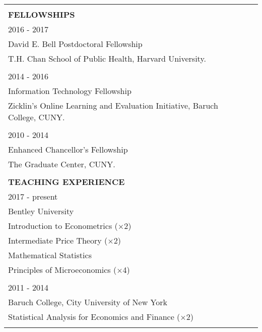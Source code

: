 \documentclass[12 pt]{article}
\begin{document}
\begin{longtable}{ccccc}
\\
\\


 \multicolumn{5}{l}{\textbf{FELLOWSHIPS}}\\[2 pt] 
 \multicolumn{4}{l}{2016 - 2017} \\
 \multicolumn{4}{l}{David E. Bell Postdoctoral Fellowship} \\
\multicolumn{4}{l}{T.H. Chan School of Public Health, Harvard University.}   \\
\\


 \multicolumn{4}{l}{2014 - 2016} \\
 \multicolumn{4}{l}{Information Technology Fellowship} \\
\multicolumn{4}{l}{Zicklin's Online Learning and Evaluation Initiative, Baruch College, CUNY.}   \\

\\

 \multicolumn{4}{l}{2010 - 2014} \\
 \multicolumn{4}{l}{Enhanced Chancellor's Fellowship}  \\
\multicolumn{4}{l}{The Graduate Center, CUNY.}   \\

\\


 \multicolumn{5}{l}{\textbf{TEACHING EXPERIENCE}}\\[2 pt] 
  \multicolumn{4}{l}{2017 - present} \\
\multicolumn{4}{l}{Bentley University}   \\
 \multicolumn{4}{l}{Introduction to Econometrics ($\times$2)}      \\
  \multicolumn{4}{l}{Intermediate Price Theory ($\times$2)}    \\
 \multicolumn{4}{l}{Mathematical Statistics}      \\
\multicolumn{4}{l}{Principles of Microeconomics ($\times$4)} \\

\\
 \multicolumn{4}{l}{2011 - 2014} \\
\multicolumn{4}{l}{Baruch College, City University of New York}     \\

\multicolumn{4}{l}{Statistical Analysis for Economics and Finance ($\times$2)}        \\

\\


\end{longtable}
\end{document}
